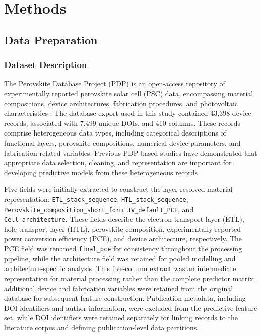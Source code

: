 \documentclass[3p]{elsarticle}
\begin{document}
\section{Methods}

\subsection{Data Preparation}

\subsubsection{Dataset Description}

The Perovskite Database Project (PDP) is an open-access repository of experimentally reported perovskite solar cell (PSC) data, encompassing material compositions, device architectures, fabrication procedures, and photovoltaic characteristics \cite{jacobsson2022open}. The database export used in this study contained 43,398 device records, associated with 7,499 unique DOIs, and 410 columns. These records comprise heterogeneous data types, including categorical descriptions of functional layers, perovskite compositions, numerical device parameters, and fabrication-related variables. Previous PDP-based studies have demonstrated that appropriate data selection, cleaning, and representation are important for developing predictive models from these heterogeneous records \cite{roberts2024machine,fukasawa2024effectiveness}.

Five fields were initially extracted to construct the layer-resolved material representation: \texttt{ETL\_stack\_sequence}, \texttt{HTL\_stack\_sequence}, \texttt{Perovskite\_composition\_short\_form}, \texttt{JV\_default\_PCE}, and \texttt{Cell\_architecture}. These fields describe the electron transport layer (ETL), hole transport layer (HTL), perovskite composition, experimentally reported power conversion efficiency (PCE), and device architecture, respectively. The PCE field was renamed \texttt{final\_pce} for consistency throughout the processing pipeline, while the architecture field was retained for pooled modelling and architecture-specific analysis. This five-column extract was an intermediate representation for material processing rather than the complete predictor matrix; additional device and fabrication variables were retained from the original database for subsequent feature construction. Publication metadata, including DOI identifiers and author information, were excluded from the predictive feature set, while DOI identifiers were retained separately for linking records to the literature corpus and defining publication-level data partitions.
\end{document}
